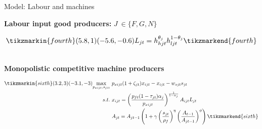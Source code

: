 \documentclass[11pt,aspectratio=169]{beamer}
\begin{document}
\begin{frame}{Model: Labour and machines}
	
	\textbf{Labour input good producers:} $J\ \in\{F,G,N\}$\\ \vspace{3mm}
	\begin{minipage}[t!]{1\textwidth}
		\begin{align*}
		\tikzmarkin{fourth}(5.8,1)(-5.6,-0.6)
		 L_{jt}=h_{hjt}^{\theta_{j}}h_{ljt}^{1-\theta_{j}}
		\tikzmarkend{fourth}
		\end{align*}
	\end{minipage}
\\

\vspace{10mm}
	\textbf{Monopolistic competitive machine producers }\\ \vspace{-1mm}
\begin{minipage}[t!]{1\textwidth}
	\begin{align*}
	\tikzmarkin{sixth}(3.2,3)(-3.1,-3)
\underset{p_{xijt}, s_{jit}}{\max}\ & p_{xijt}(1+\zeta_{jt})x_{ijt}-x_{ijt}-w_{sjt}s_{jt}\\
s.t.\ & x_{ijt}= \left(\frac{p_{ft}(1-\tau_{jt})\alpha_j}{p_{xijt}}\right)^\frac{1}{1-\alpha_j}A_{ijt}L_{jt}\\
& A_{jt}=A_{jt-1}\left(1+\gamma\left(\frac{s_{jt}}{\rho_f}\right)^\eta\left(\frac{A_{t-1}}{A_{jt-1}}\right)^\phi\right)
	\tikzmarkend{sixth}
	\end{align*}
\end{minipage}
\end{frame}
%
\end{document}
